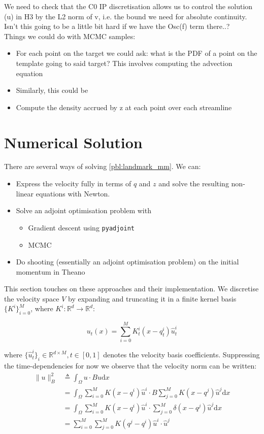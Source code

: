 \documentclass{article}
\newcommand{\norm}[2]{\| #1 \|_{ #2 }}
\newcommand{\bnorm}[1]{\norm{ #1 }{B}}
\newcommand{\diff}[1]{\text{d} #1}
\begin{document}
We need to check that the C0 IP discretisation allows us to control the solution
(u) in H3 by the L2 norm of v, i.e. the bound we need for absolute continuity.
Isn't this going to be a little bit hard if we have the Osc(f) term there..?\\

Things we could do with MCMC samples:
\begin{itemize}
\item For each point on the target we could ask: what is the PDF of a point on
the template going to said target? This involves computing the advection
equation
\item Similarly, this could be 
\item Compute the density accrued by z at each point over each streamline
\end{itemize}

\section{Numerical Solution}

There are several ways of solving \eqref{pbl:landmark_mm}. We can:
\begin{itemize}
\item Express the velocity fully in terms of $q$ and $z$ and solve the resulting
non-linear equations with Newton.
\item Solve an adjoint optimisation problem with
  \begin{itemize}
  \item Gradient descent using \texttt{pyadjoint}
  \item MCMC
  \end{itemize}
\item Do shooting (essentially an adjoint optimisation problem) on the initial
momentum in Theano
\end{itemize}

This section touches on these approaches and their implementation. We discretise
the velocity space $V$ by expanding and truncating it in a finite kernel basis
$\{K^i\}_{i=0}^M$, where $K^i : \mathbb{R}^d \rightarrow \mathbb{R}^d$:

\begin{equation}
u_t(x) = \sum_{i=0}^M K^i_t(x - q^i_t)\hat u^i_t \label{eq:ele_u_disc}
\end{equation}

where $\{\hat u^i_t\}_i \in \mathbb{R}^{d\times M}, t\in[0,1]$ denotes the
velocity basis coefficients. Suppressing the time-dependencies for now we
observe that the velocity norm can be written:
\begin{align*}
\bnorm{u}^2 & \triangleq \int_\Omega u\cdot Bu \diff{x}\\
            & = \int_\Omega\sum_{i=0}^M K(x-q^i)\hat u^i \cdot B \sum_{j=0}^M
            K(x-q^j)\hat u^j \diff{x}\\
            & = \int_\Omega \sum_{i=0}^M K(x-q^i)\hat u^i \cdot \sum_{j=0}^M
            \delta (x-q^j)\hat u^j \diff{x}\\
            & = \sum_{i=0}^M \sum_{j=0}^M K(q^j-q^i)\hat u^i \cdot\hat u^j
\end{align*}
\end{document}
